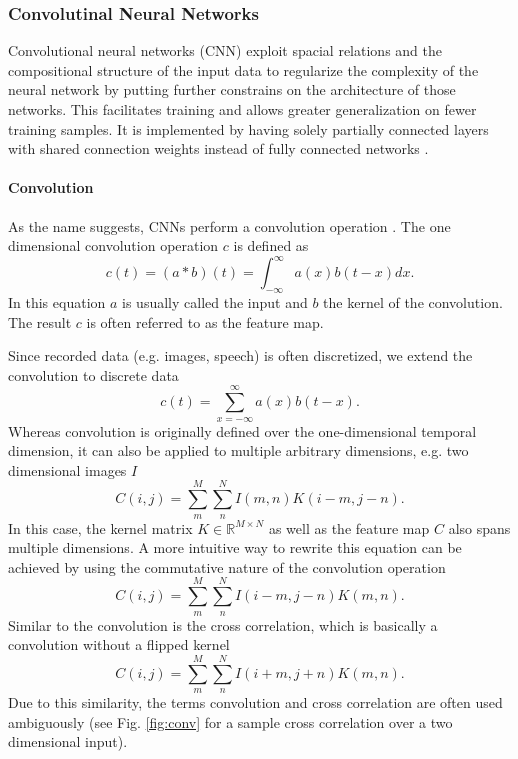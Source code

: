 \subsubsection{Convolutinal Neural Networks} \label{c:cnns}

Convolutional neural networks (CNN) exploit spacial relations and the compositional structure of the input data to regularize the complexity of the neural network by putting further constrains on the architecture of those networks.
This facilitates training and allows greater generalization on fewer training samples.
It is implemented by having solely partially connected layers with shared connection weights instead of fully connected networks \cite{lecun1989backpropagation}\cite{Goodfellow-et-al-2016-Book}.    

\paragraph{Convolution} \label{c:convolution}

As the name suggests, CNNs perform a convolution operation \cite{Goodfellow-et-al-2016-Book}. The one dimensional convolution operation $c$ is defined as
\[
c(t) = (a * b)(t) = \int_{- \infty}^{\infty} a(x)b(t-x) dx.
\]
In this equation $a$ is usually called the input and $b$ the kernel of the convolution. The result $c$ is often referred to as the feature map.

Since recorded data (e.g. images, speech) is often discretized, we extend the convolution to discrete data
\[
c(t) = \sum_{x = - \infty}^{\infty} a(x)b(t-x).
\]
Whereas convolution is originally defined over the one-dimensional temporal dimension, it can also be applied to multiple arbitrary dimensions, e.g. two dimensional images $I$
\[
C(i,j) = \sum_m^M \sum_n^N I(m,n) K(i - m, j -n).
\]
In this case, the kernel matrix $K \in \mathbb{R}^{M \times N} $ as well as the feature map $C$ also spans multiple dimensions.
A more intuitive way to rewrite this equation can be achieved by using the commutative nature of the convolution operation
\[
C(i,j) = \sum_m^M \sum_n^N I(i - m,j - n) K(m, n).
\]
Similar to the convolution is the cross correlation, which is basically a convolution without a flipped kernel
\[
C(i,j) = \sum_m^M \sum_n^N I(i + m,j + n) K(m, n).
\]
Due to this similarity, the terms convolution and cross correlation are often used ambiguously (see Fig. \ref{fig:conv} for a sample cross correlation over a two dimensional input).

